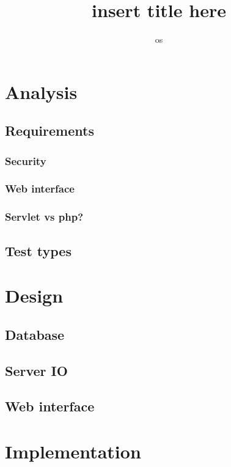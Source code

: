 

\title{insert title here}
\author{os}


\maketitle
\tableofcontents



\chapter{Analysis}
  \section{Requirements}
    \subsection{Security}
    \subsection{Web interface}
    \subsection{Servlet vs php?}
  \section{Test types}

\chapter{Design}
  \section{Database}
  \section{Server IO}
  \section{Web interface}

\chapter{Implementation}
